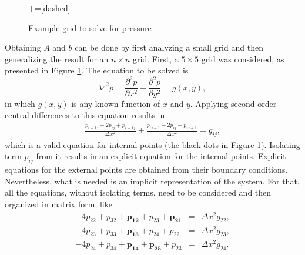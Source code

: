\documentclass[journal]{IEEEtran}
\begin{document}
\begin{figure}[!ht]
\centering
{}+=[dashed]%
\caption{Example grid to solve for pressure\label{examplePressureGrid}}
\end{figure}

Obtaining $A$ and $b$ can be done by first analyzing a small grid and then generalizing the result for an $n\times n$ grid. First, a $5\times 5$ grid was considered, as presented in Figure \ref{examplePressureGrid}. The equation to be solved is \begin{equation}
\nabla^2 p = \frac{\partial^2 p}{\partial x^2} + \frac{\partial^2 p}{\partial y^2} = g(x,y), \label{poissonEquation}
\end{equation} in which $g(x,y)$ is any known function of $x$ and $y$. Applying second order central differences to this equation results in \begin{eqnarray}
\frac{p_{i-1j} - 2p_{ij} + p_{i+1j}}{\Delta x^2}	+ \frac{p_{ij-1} - 2p_{ij} + p_{ij+1}}{\Delta x^2} = g_{ij},\label{poissonSecond}
\end{eqnarray} which is a valid equation for internal points (the black dots in Figure \ref{examplePressureGrid}). Isolating term $p_{ij}$ from it results in an explicit equation for the internal points. Explicit equations for the external points are obtained from their boundary conditions. Nevertheless, what is needed is an implicit representation of the system. For that, all the equations, without isolating terms, need to be considered and then organized in matrix form, like \begin{eqnarray}
-4p_{22} + p_{32} + \boldsymbol{p_{12}} + p_{23} + \boldsymbol{p_{21}} &=& \Delta x^2 g_{22}, \label{internalPoissonEq1}\\
-4p_{23} + p_{33} + \boldsymbol{p_{13}} + p_{24} + p_{22} &=& \Delta x^2 g_{23}\label{internalPoissonEq2},\\
-4p_{24} + p_{34} + \boldsymbol{p_{14}} + \boldsymbol{p_{25}} + p_{23} &=& \Delta x^2 g_{24}.\label{internalPoissonEq3}
\end{eqnarray}
\end{document}
